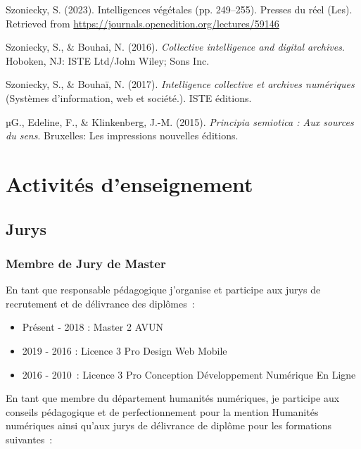 \documentclass[
  a4paper,
  DIV=11,
  numbers=noendperiod]{scrreprt}
\newlength{\cslhangindent}
\newenvironment{CSLReferences}[2] %
 {\begin{list}{}{%
  \setlength{\itemindent}{0pt}
  \setlength{\leftmargin}{0pt}
  \setlength{\parsep}{0pt}
  \ifodd #1
   \setlength{\leftmargin}{\cslhangindent}
   \setlength{\itemindent}{-1\cslhangindent}
  \fi
  \setlength{\itemsep}{#2\baselineskip}}}
 {\end{list}}
\begin{document}
\begin{CSLReferences}{1}{0}
Szoniecky, S. (2023). Intelligences végétales (pp. 249--255). Presses du
réel (Les). Retrieved from
\url{https://journals.openedition.org/lectures/59146}

Szoniecky, S., \& Bouhai, N. (2016). \emph{Collective intelligence and
digital archives}. Hoboken, NJ: ISTE Ltd/John Wiley; Sons Inc.

Szoniecky, S., \& Bouhaï, N. (2017). \emph{Intelligence collective et
archives numériques} (Systèmes d'information, web et société.). ISTE
éditions.

µG., Edeline, F., \& Klinkenberg, J.-M. (2015). \emph{Principia
semiotica : Aux sources du sens}. Bruxelles: Les impressions nouvelles
éditions.

\end{CSLReferences}

\section{Activités d'enseignement}\label{activituxe9s-denseignement-1}

\subsection{Jurys}\label{jurys}

\subsubsection{\texorpdfstring{\textbf{Membre de Jury de
Master}}{Membre de Jury de Master}}\label{membre-de-jury-de-master}

En tant que responsable pédagogique j'organise et participe aux jurys de
recrutement et de délivrance des diplômes~:

\begin{itemize}
\item
  Présent - 2018 : Master 2 AVUN
\item
  2019 - 2016 : Licence 3 Pro Design Web Mobile
\item
  2016 - 2010~: Licence 3 Pro Conception Développement Numérique En
  Ligne
\end{itemize}

En tant que membre du département humanités numériques, je participe aux
conseils pédagogique et de perfectionnement pour la mention Humanités
numériques ainsi qu'aux jurys de délivrance de diplôme pour les
formations suivantes~:
\end{document}
